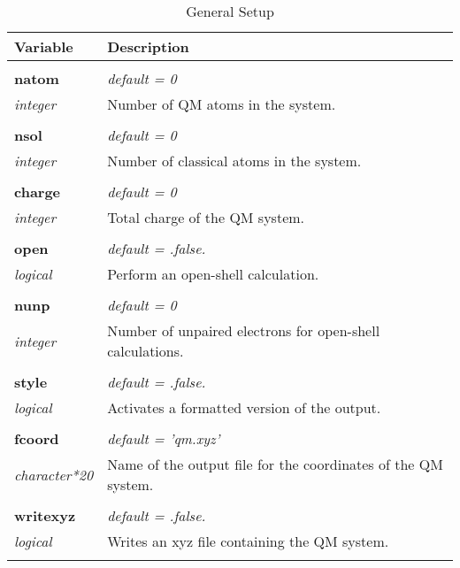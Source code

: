 \begin{Spacing}{1.0}
\begin{longtable}{ p{} p{} }

   \toprule
   \textbf{Variable} & Description \\*
   \midrule \\*
   \endhead

   \bottomrule
   \caption{General Setup}
   \endfoot

   \textbf{natom}
   &  \textit{default = 0 }
   \\*\textit{integer}
   & Number of QM atoms in the system.\\* \\

   \textbf{nsol}
   &  \textit{default = 0 }
   \\*\textit{integer}
   & Number of classical atoms in the system.\\* \\

   \textbf{charge}
   &  \textit{default = 0 }
   \\*\textit{integer}
   & Total charge of the QM system.\\* \\

   \textbf{open}
   &  \textit{default = .false. }
   \\*\textit{logical}
   & Perform an open-shell calculation.\\* \\

   \textbf{nunp}
   &  \textit{default = 0 }
   \\*\textit{integer}
   & Number of unpaired electrons for open-shell
   calculations.\\* \\

   \textbf{style}
   &  \textit{default = .false. }
   \\*\textit{logical}
   & Activates a formatted version of the output.\\* \\

   \textbf{fcoord}
   &  \textit{default = 'qm.xyz' }
   \\*\textit{character*20}
   & Name of the output file for the coordinates of the
   QM system.\\* \\

   \textbf{writexyz}
   &  \textit{default = .false. }
   \\*\textit{logical}
   & Writes an xyz file containing the QM system.\\* \\


\end{longtable}
\end{Spacing}

